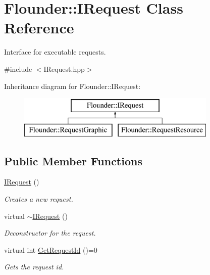 \hypertarget{class_flounder_1_1_i_request}{}\section{Flounder\+:\+:I\+Request Class Reference}
\label{class_flounder_1_1_i_request}


Interface for executable requests.  




{\ttfamily \#include $<$I\+Request.\+hpp$>$}

Inheritance diagram for Flounder\+:\+:I\+Request\+:\begin{figure}[H]
\begin{center}
\leavevmode
\includegraphics[height=2.000000cm]{class_flounder_1_1_i_request}
\end{center}
\end{figure}
\subsection*{Public Member Functions}
\begin{DoxyCompactItemize}
\item 
\hyperlink{class_flounder_1_1_i_request_a549d8b659bec5ebc40ff31bdb6e5dbd1}{I\+Request} ()
\begin{DoxyCompactList}\small\item\em Creates a new request. \end{DoxyCompactList}\item 
virtual \hyperlink{class_flounder_1_1_i_request_ab1ef5d498a1a5aa550aa9af6ea602f0f}{$\sim$\+I\+Request} ()
\begin{DoxyCompactList}\small\item\em Deconstructor for the request. \end{DoxyCompactList}\item 
virtual int \hyperlink{class_flounder_1_1_i_request_a13fa86b3ecc0b67101179291fdfca9bc}{Get\+Request\+Id} ()=0
\begin{DoxyCompactList}\small\item\em Gets the request id. \end{DoxyCompactList}\end{DoxyCompactItemize}



